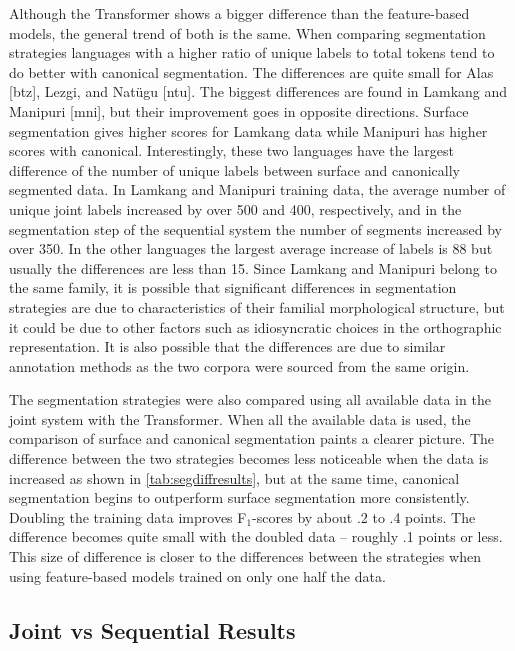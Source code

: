 Although the Transformer shows a bigger difference than the feature-based models, the general trend of both is the same. When comparing segmentation strategies languages with a higher ratio of unique labels to total tokens tend to do better with canonical segmentation. The differences are quite small for Alas [btz], Lezgi, and Nat\"ugu [ntu]. The biggest differences are found in Lamkang and Manipuri [mni], but their improvement goes in opposite directions. Surface segmentation gives higher scores for Lamkang data while Manipuri has higher scores with canonical. Interestingly, these two languages have the largest difference of the number of unique labels between surface and canonically segmented data. In Lamkang and Manipuri training data, the average number of unique joint labels increased by over 500 and 400, respectively, and in the segmentation step of the sequential system the number of segments increased by over 350. In the other languages the largest average increase of labels is 88 but usually the differences are less than 15. Since Lamkang and Manipuri belong to the same family, it is possible that significant differences in segmentation strategies are due to characteristics of their familial morphological structure, but it could be due to other factors such as idiosyncratic choices in the orthographic representation. 
It is also possible that the differences are due to similar annotation methods as the two corpora were sourced from the same origin. %

The segmentation strategies were also compared using all available data in the joint system with the Transformer.  When all the available data is used, the comparison of surface and canonical segmentation paints a clearer picture. The difference between the two strategies becomes less noticeable when the data is increased as shown in \autoref{tab:segdiffresults}, but at the same time, canonical segmentation begins to outperform surface segmentation more consistently.  
Doubling the training data improves F$_1$-scores by about .2 to .4 points. The difference becomes quite small with the doubled data -- roughly .1 points or less. This size of difference is closer to the differences between the strategies when using feature-based models trained on only one half the data. 


\subsection{Joint vs Sequential Results}

